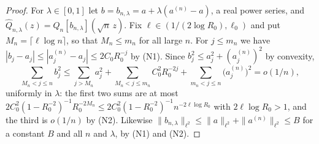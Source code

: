 \documentclass[11pt]{amsart}
\theoremstyle{definition}
\theoremstyle{remark}
\numberwithin{equation}{section}
\begin{document}
\begin{proof}
For $\lambda\in[0,1]$ let $b=b_{n,\lambda}=a+\lambda(a^{(n)}-a)$, a real power series, and $\widehat Q_{n,\lambda}(z)=Q_n[b_{n,\lambda}](\sqrt n\,z)$. Fix $\ell\in(1/(2\log R_0),\ell_0)$ and put $M_n=\lceil\ell\log n\rceil$, so that $M_n\le m_n$ for all large $n$. For $j\le m_n$ we have $|b_j-a_j|\le|a^{(n)}_j-a_j|\le2C_0R_0^{-j}$ by (N1). Since $b_j^2\le a_j^2+(a^{(n)}_j)^2$ by convexity,
\begin{equation}\label{eq:moving-tail}
\sum_{M_n<j\le n}b_j^2\le\sum_{j>M_n}a_j^2+\sum_{M_n<j\le m_n}C_0^2R_0^{-2j}+\sum_{m_n<j\le n}\bigl(a^{(n)}_j\bigr)^2=o(1/n),
\end{equation}
uniformly in $\lambda$: the first two sums are at most $2C_0^2(1-R_0^{-2})^{-1}R_0^{-2M_n}\le2C_0^2(1-R_0^{-2})^{-1}n^{-2\ell\log R_0}$ with $2\ell\log R_0>1$, and the third is $o(1/n)$ by (N2). Likewise $\|b_{n,\lambda}\|_{\ell^2}\le\|a\|_{\ell^2}+\|a^{(n)}\|_{\ell^2}\le B$ for a constant $B$ and all $n$ and $\lambda$, by (N1) and (N2).


\end{proof}
\end{document}

